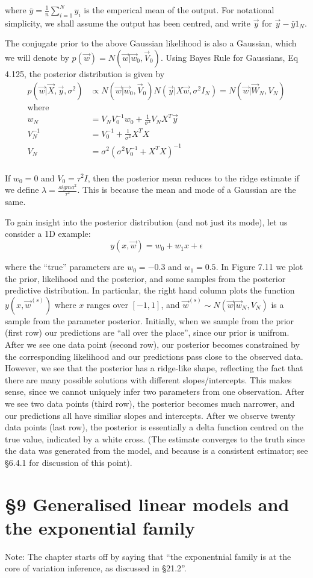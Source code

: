 \documentclass{amsart}
\begin{document}
where $\bar{y} = \frac{1}{n} \sum_{i=1}^N y_i$ is the emperical mean of the output. For
notational simplicity, we shall assume the output has been centred, and write $\vec{y}$ for
$\vec{y} - \bar{y} 1_N$.

The conjugate prior to the above Gaussian likelihood is also a Gaussian, which we will
denote by $p(\vec{w}) = N(\vec{w} | \vec{w}_0, \vec{V}_0)$. Using Bayes Rule for Gaussians,
Eq 4.125, the posterior distribution is given by
\begin{align*}
p(\vec{w}|\vec{X}, \vec{y}, \sigma^2) &\propto N(\vec{w}|\vec{w}_0, \vec{V}_0) N(\vec{y}|X \vec{w}, \sigma^2 I_N) = N(\vec{w}|\vec{W}_N, V_N) \\
\text{where}\\
w_N &= V_N V_0^{-1} w_0 + \frac{1}{\sigma^2} V_N X^T \vec{y} \\
V_N^{-1} &= V_0^{-1} + \frac{1}{\sigma^2} X^T X \\
V_N &= \sigma^2 (\sigma^2 V_0^{-1} + X^T X)^{-1} \\
\end{align*}

If $w_0 = 0$ and $V_0 = \tau^2 I$, then the posterior mean reduces to the ridge estimate
if we define $\lambda = \frac{sigma^2}{\tau^2}$. This is because the mean and mode of a 
Gaussian are the same.

To gain insight into the posterior distribution (and not just its mode), let us consider a
1D example:
\[
y(x, \vec{w}) = w_0 + w_1 x + \epsilon
\]

where the ``true'' parameters are $w_0 = -0.3$ and $w_1 = 0.5$. In Figure 7.11 we plot the
prior, likelihood and the posterior, and some samples from the posterior predictive
distribution. In particular, the right hand column plots the function $y(x, \vec{w}^{(s)})$
where $x$ ranges over $[-1, 1]$, and $\vec{w}^{(s)} \sim N(\vec{w} | \vec{w}_N, V_N)$ is a
sample from the parameter posterior. Initially, when we sample from the prior (first row)
our predictions are ``all over the place'', since our prior is unifrom. After we see one
data point (second row), our posterior becomes constrained by the corresponding likelihood
and our predictions pass close to the observed data. However, we see that the posterior has
a ridge-like shape, reflecting the fact that there are many possible solutions with
different slopes/intercepts. This makes sense, since we cannot uniquely infer two parameters
from one observation. After we see two data points (third row), the posterior becomes
much narrower, and our predictions all have similiar slopes and intercepts. After we observe
twenty data points (last row), the posterior is essentially a delta function centred on
the true value, indicated by a white cross. (The estimate converges to the truth since the data was generated from the model, and because is a consistent estimator; see \S 6.4.1
for discussion of this point).

\section{\S 9 Generalised linear models and the exponential family}
Note: The chapter starts off by saying that ``the exponentnial family is at the core
of variation inference, as discussed in \S 21.2''.
\end{document}
